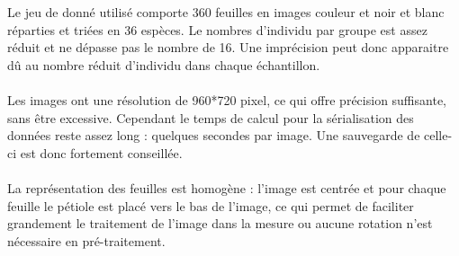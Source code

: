 Le jeu de donné utilisé comporte 360 feuilles en images couleur et noir et blanc réparties et triées en 36 espèces. Le nombres d'individu par groupe est assez réduit et ne dépasse pas le nombre de 16. Une imprécision peut donc apparaitre dû au nombre réduit d'individu dans chaque échantillon.
\paragraph{}
Les images ont une résolution de 960*720 pixel, ce qui offre précision suffisante, sans être excessive. Cependant le temps de calcul pour la sérialisation des données reste assez long : quelques secondes par image. Une sauvegarde de celle-ci est donc fortement conseillée.
\paragraph{}
La représentation des feuilles est homogène : l'image est centrée et pour chaque feuille le pétiole est placé vers le bas de l'image, ce qui permet de faciliter grandement le traitement de l'image dans la mesure ou aucune rotation n'est nécessaire en pré-traitement.

